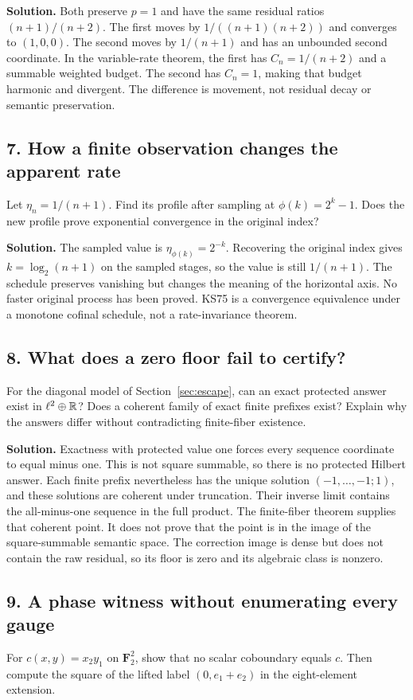 \textbf{Solution.} Both preserve $p=1$ and have the same residual ratios $(n+1)/(n+2)$. The first moves by $1/((n+1)(n+2))$ and converges to $(1,0,0)$. The second moves by $1/(n+1)$ and has an unbounded second coordinate. In the variable-rate theorem, the first has $C_n=1/(n+2)$ and a summable weighted budget. The second has $C_n=1$, making that budget harmonic and divergent. The difference is movement, not residual decay or semantic preservation.

\subsection*{7. How a finite observation changes the apparent rate}
Let $\eta_n=1/(n+1)$. Find its profile after sampling at $\phi(k)=2^k-1$. Does the new profile prove exponential convergence in the original index?

\textbf{Solution.} The sampled value is $\eta_{\phi(k)}=2^{-k}$. Recovering the original index gives $k=\log_2(n+1)$ on the sampled stages, so the value is still $1/(n+1)$. The schedule preserves vanishing but changes the meaning of the horizontal axis. No faster original process has been proved. KS75 is a convergence equivalence under a monotone cofinal schedule, not a rate-invariance theorem.

\subsection*{8. What does a zero floor fail to certify?}
For the diagonal model of Section~\ref{sec:escape}, can an exact protected answer exist in $\ell^2\oplus\mathbb R$? Does a coherent family of exact finite prefixes exist? Explain why the answers differ without contradicting finite-fiber existence.

\textbf{Solution.} Exactness with protected value one forces every sequence coordinate to equal minus one. This is not square summable, so there is no protected Hilbert answer. Each finite prefix nevertheless has the unique solution $(-1,\ldots,-1;1)$, and these solutions are coherent under truncation. Their inverse limit contains the all-minus-one sequence in the full product. The finite-fiber theorem supplies that coherent point. It does not prove that the point is in the image of the square-summable semantic space. The correction image is dense but does not contain the raw residual, so its floor is zero and its algebraic class is nonzero.

\subsection*{9. A phase witness without enumerating every gauge}
For $c(x,y)=x_2y_1$ on $\mathbf F_2^2$, show that no scalar coboundary equals $c$. Then compute the square of the lifted label $(0,e_1+e_2)$ in the eight-element extension.

